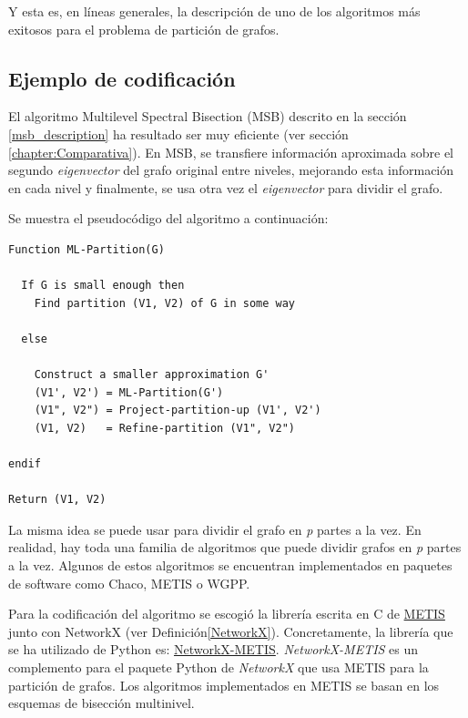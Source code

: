 Y esta es, en líneas generales, la descripción de uno de los algoritmos más exitosos para el problema de partición de grafos.

\subsection{Ejemplo de codificación}

El algoritmo Multilevel Spectral Bisection (MSB) descrito en la sección \ref{msb_description} ha resultado ser muy eficiente (ver sección \ref{chapter:Comparativa}). En MSB, se transfiere información aproximada sobre el segundo \textit{eigenvector} del grafo original entre niveles, mejorando esta información en cada nivel y finalmente, se usa otra vez el \textit{eigenvector} para dividir el grafo. 

Se muestra el pseudocódigo del algoritmo a continuación:

\begin{lstlisting}[frame=single] 
Function ML-Partition(G)

  If G is small enough then
    Find partition (V1, V2) of G in some way
    
  else

    Construct a smaller approximation G'
    (V1', V2') = ML-Partition(G')
    (V1", V2") = Project-partition-up (V1', V2')
    (V1, V2)   = Refine-partition (V1", V2")

endif

Return (V1, V2)
\end{lstlisting}

La misma idea se puede usar para dividir el grafo en \textit{p} partes a la vez. En realidad, hay toda una familia de algoritmos que puede dividir grafos en \textit{p} partes a la vez. Algunos de estos algoritmos se encuentran implementados en paquetes de software como Chaco\cite{Chaco}, METIS\cite{MeTis} o WGPP\cite{WGPP}.

Para la codificación del algoritmo se escogió la librería escrita en C de \href{http://glaros.dtc.umn.edu/gkhome/metis/metis/overview}{METIS} junto con NetworkX (ver Definición\ref{NetworkX}). Concretamente, la librería que se ha utilizado de Python es: \href{https://networkx-metis.readthedocs.io/en/latest/reference/generated/nxmetis.partition.html#nxmetis.partition}{NetworkX-METIS}. \textit{NetworkX-METIS} es un complemento para el paquete Python de \textit{NetworkX} que usa METIS\cite{MeTis} para la partición de grafos. Los algoritmos implementados en METIS se basan en los esquemas de bisección multinivel.

